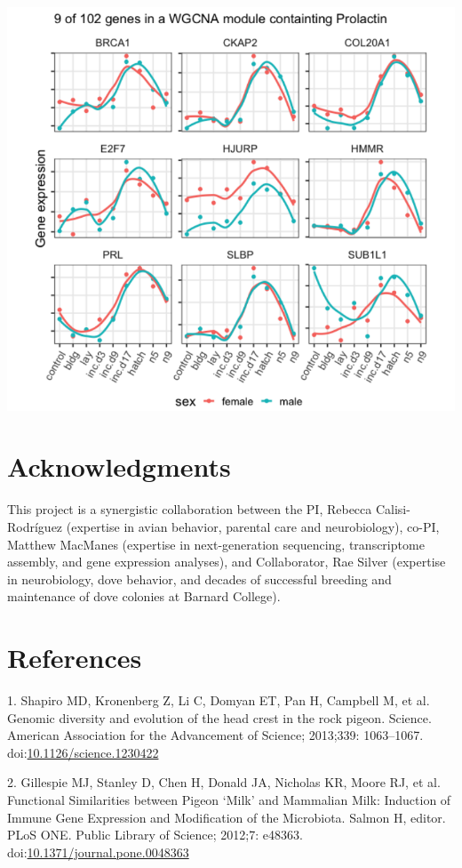 \documentclass[10pt,letterpaper]{article}
\begin{document}
\includegraphics{characterization_manuscript_files/figure-latex/unnamed-chunk-6-1.pdf}

\hypertarget{acknowledgments}{%
\section{Acknowledgments}\label{acknowledgments}}

This project is a synergistic collaboration between the PI, Rebecca
Calisi-Rodríguez (expertise in avian behavior, parental care and
neurobiology), co-PI, Matthew MacManes (expertise in next-generation
sequencing, transcriptome assembly, and gene expression analyses), and
Collaborator, Rae Silver (expertise in neurobiology, dove behavior, and
decades of successful breeding and maintenance of dove colonies at
Barnard College).

\hypertarget{references}{%
\section*{References}\label{references}}

\hypertarget{refs}{}
\leavevmode\hypertarget{ref-Shapiro1063}{}%
1. Shapiro MD, Kronenberg Z, Li C, Domyan ET, Pan H, Campbell M, et al.
Genomic diversity and evolution of the head crest in the rock pigeon.
Science. American Association for the Advancement of Science; 2013;339:
1063--1067.
doi:\href{https://doi.org/10.1126/science.1230422}{10.1126/science.1230422}

\leavevmode\hypertarget{ref-Gillespie2012}{}%
2. Gillespie MJ, Stanley D, Chen H, Donald JA, Nicholas KR, Moore RJ, et
al. Functional Similarities between Pigeon `Milk' and Mammalian Milk:
Induction of Immune Gene Expression and Modification of the Microbiota.
Salmon H, editor. PLoS ONE. Public Library of Science; 2012;7: e48363.
doi:\href{https://doi.org/10.1371/journal.pone.0048363}{10.1371/journal.pone.0048363}

\nolinenumbers
\end{document}
